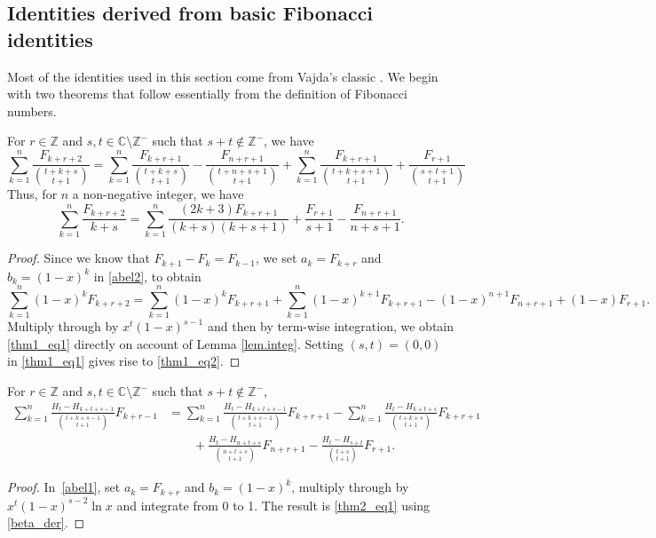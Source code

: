 \documentclass[12pt,reqno]{article}
\begin{document}
	\subsection{Identities derived from basic Fibonacci identities}
	
	Most of the identities used in this section come from Vajda's classic \cite{Vajda}.
	We begin with two theorems that follow essentially from the definition of Fibonacci numbers.
	
	\begin{theorem}
		For $r\in\mathbb{Z}$ and $s,t\in \mathbb{C}\setminus\mathbb{Z}^{-}$ such that $s+t\notin\mathbb{Z}^{-}$, we have
		\begin{equation}\label{thm1_eq1}
			\sum_{k = 1}^n \frac{F_{k+r+2}}{\binom{t+k+s}{t+1}} = \sum_{k = 1}^n \frac{F_{k+r+1}}{\binom{t+k+s}{t+1}}
			- \frac{F_{n+r+1}}{\binom{t+n+s+1}{t+1}} + \sum_{k = 1}^n \frac{F_{k+r+1}}{\binom{t+k+s+1}{t+1}} + \frac{F_{r+1}}{\binom{s+t+1}{t+1}}
		\end{equation}
		Thus, for $n$ a non-negative integer, we have
		\begin{equation}\label{thm1_eq2}
			\sum_{k=1}^n\frac{F_{k+r+2}}{k+s} = \sum_{k=1}^n \frac{(2k+3)F_{k+r+1}}{(k+s)(k+s+1)} + \frac{F_{r+1}}{s+1} - \frac{F_{n+r+1}}{n+s+1} .
		\end{equation}
	\end{theorem}
	
	\begin{proof}
		Since we know that $F_{k+1}-F_k=F_{k-1}$, we set $a_k=F_{k+r}$ and $b_k=(1-x)^k$ in \eqref{abel2}, to obtain
		\begin{equation*}
			\sum_{k=1}^n (1-x)^k F_{k+r+2} = \sum_{k=1}^n (1-x)^k F_{k+r+1} + \sum_{k=1}^n (1-x)^{k+1} F_{k+r+1} - (1-x)^{n+1} F_{n+r+1} + (1-x)F_{r+1}.
		\end{equation*}
		Multiply through by $x^t(1-x)^{s-1}$ and then by term-wise integration, we obtain \eqref{thm1_eq1} directly on account
		of Lemma \ref{lem.integ}. Setting $(s,t)=(0,0)$ in \eqref{thm1_eq1} gives rise to \eqref{thm1_eq2}.
	\end{proof}
	
	\begin{theorem}
		For $r\in \mathbb{Z}$ and $s,t\in \mathbb{C}\setminus \mathbb{Z}^{-}$ such that $s+t\notin \mathbb{Z}^{-}$,
		\begin{equation}\label{thm2_eq1}
			\begin{split}
				\sum_{k = 1}^n \frac{H_{t}-H_{k+t+s-1}}{\binom{t+k+s-1}{t+1}}F_{k+r-1} &=
				\sum_{k = 1}^n \frac{H_{t}-H_{k+t+s-1}}{\binom{t+k+s-1}{t+1}}F_{k+r+1} - \sum_{k = 1}^n \frac{H_{t}-H_{k+t+s}}{\binom{t+k+s}{t+1}}F_{k+r+1} \\ &\qquad + \frac{H_{t}-H_{n+t+s}}{\binom{n+t+s}{t+1}}F_{n+r+1} - \frac{H_{t}-H_{s+t}}{\binom{t+s}{t+1}}F_{r+1}.
			\end{split}
		\end{equation}
	\end{theorem}
	\begin{proof}
		In~\eqref{abel1}, set $a_k=F_{k+r}$ and $b_k=(1-x)^k$, multiply through by $x^t(1-x)^{s-2}\ln x$ and integrate from 0 to 1. The result is
		\eqref{thm2_eq1} using \eqref{beta_der}. 
	\end{proof}
	
\end{document}
